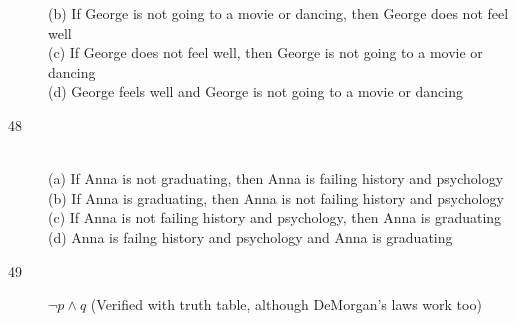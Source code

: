 \begin{description}
		(b) If George is not going to a movie or dancing, then George does not feel well \\
		(c) If George does not feel well, then George is not going to a movie or dancing \\
		(d) George feels well and George is not going to a movie or dancing
	\item[48] \hfill \\
		(a) If Anna is not graduating, then Anna is failing history and psychology \\
		(b) If Anna is graduating, then Anna is not failing history and psychology \\
		(c) If Anna is not failing history and psychology, then Anna is graduating \\
		(d) Anna is failng history and psychology and Anna is graduating
	\item[49] $\lnot p \land q$ (Verified with truth table, although DeMorgan's laws work too)

\end{description}

